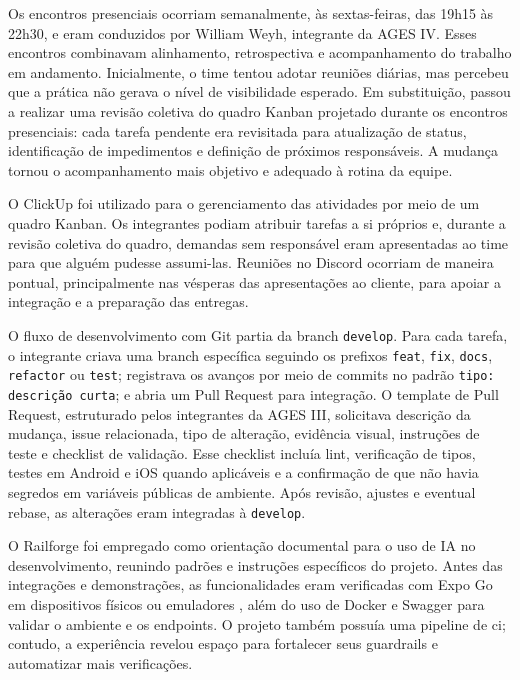 Os encontros presenciais ocorriam semanalmente, às sextas-feiras, das 19h15 às
22h30, e eram conduzidos por William Weyh, integrante da AGES IV. Esses encontros
combinavam alinhamento, retrospectiva e acompanhamento do trabalho em andamento.
Inicialmente, o time tentou adotar reuniões diárias, mas percebeu que a prática
não gerava o nível de visibilidade esperado. Em substituição, passou a realizar
uma revisão coletiva do quadro Kanban projetado durante os encontros presenciais:
cada tarefa pendente era revisitada para atualização de status, identificação de
impedimentos e definição de próximos responsáveis. A mudança tornou o
acompanhamento mais objetivo e adequado à rotina da equipe.

O ClickUp foi utilizado para o gerenciamento das atividades por meio de um
quadro Kanban. Os integrantes podiam atribuir tarefas a si próprios e, durante a
revisão coletiva do quadro, demandas sem responsável eram apresentadas ao time
para que alguém pudesse assumi-las. Reuniões no Discord ocorriam de maneira
pontual, principalmente nas vésperas das apresentações ao cliente, para apoiar a
integração e a preparação das entregas.

O fluxo de desenvolvimento com Git \cite{git} partia da branch \texttt{develop}. Para cada tarefa,
o integrante criava uma branch específica seguindo os prefixos \texttt{feat},
\texttt{fix}, \texttt{docs}, \texttt{refactor} ou \texttt{test}; registrava os
avanços por meio de commits no padrão \texttt{tipo: descrição curta}; e abria um
Pull Request para integração. O template de Pull Request, estruturado pelos
integrantes da AGES III, solicitava descrição da mudança, issue relacionada,
tipo de alteração, evidência visual, instruções de teste e checklist de
validação. Esse checklist incluía lint, verificação de tipos, testes em Android
e iOS quando aplicáveis e a confirmação de que não havia segredos em variáveis
públicas de ambiente. Após revisão, ajustes e eventual rebase, as alterações eram
integradas à \texttt{develop}.

O Railforge foi empregado como orientação documental para o uso de IA no
desenvolvimento, reunindo padrões e instruções específicos do projeto. Antes das
integrações e demonstrações, as funcionalidades eram verificadas com Expo Go em
dispositivos físicos ou emuladores \cite{expo}, além do uso de Docker
\cite{docker} e Swagger \cite{swagger} para validar o ambiente e os endpoints.
O projeto também possuía uma pipeline de \ac{ci}; contudo, a experiência revelou
espaço para fortalecer seus guardrails e automatizar mais verificações.

